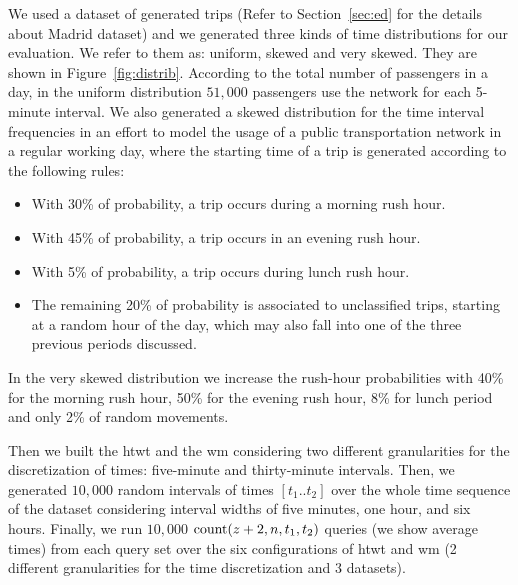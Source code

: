 	We used a dataset of generated trips  (Refer to Section~\ref{sec:ed} for the details about Madrid dataset) and we
	generated three kinds of time distributions for our evaluation. We refer to them as: uniform, skewed and very skewed. They are shown
	in Figure~\ref{fig:distrib}. 
	According to the total number of passengers in a day, in the uniform distribution $51,\!000$ passengers 
	use the network for each 5-minute interval. 
	We also generated a skewed distribution for the time interval frequencies in an effort to
	model the usage of a public transportation network in a regular working day, where the starting time of a trip
	is generated according to the following rules:
	\begin{itemize}
		\item With 30\% of probability, a trip occurs during a morning rush hour.
		\item With 45\% of probability, a trip occurs in an evening rush hour.
		\item With 5\% of probability, a trip occurs during lunch rush hour.
		\item The remaining 20\% of probability is associated to unclassified trips, starting at a random hour of the day, which may
		also fall into one of the three previous periods discussed.
	\end{itemize}
	In the very skewed distribution we increase the rush-hour probabilities with
	40\% for the morning rush hour, 50\% for the evening rush hour, 8\% for lunch period and only
	2\% of random movements.
	\medskip

	Then we built the \gls{htwt} and the \gls{wm} considering two different granularities for the discretization of times: 
	five-minute and thirty-minute intervals. Then, we generated $10,\!000$ random intervals of times $[t_1..t_2]$ over the whole 
	time sequence of the dataset considering interval widths of five minutes, one hour, and six hours.  
	Finally, we run $10,\!000$  $\operatorname{count}(z+2,n,t_1,t_2)$ queries (we show average times) from each query set over 
	the six configurations of \gls{htwt} and \gls{wm}  
	(2 different granularities for the time discretization and 3 datasets).






